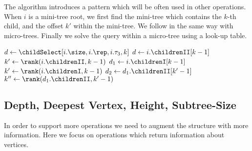 The algorithm \childSelect{} introduces a pattern which will be often used in other operations.
When $i$ is a mini-tree root, we first find the mini-tree which contains the $k$-th child, and the offset $k'$ within the mini-tree.
We follow in the same way with micro-trees.
Finally we solve the query within a micro-tree using a look-up table.

\begin{algorithm}
\begin{algorithmic}
		\State $d \gets \childSelect[i.\size, i.\rep, i.\tau_3, k]$
		\State {}
		\State $d \gets i.\childrenII[k - 1]$
		\State $k' \gets \rank(i.\childrenII, k - 1)$
		 
			\State {}
		\Else {}
			\State {}
		\EndIf
	\Else
		\State $d_1 \gets i.\childrenI[k - 1]$
		\State $k' \gets \rank(i.\childrenI, k - 1)$
		 
			\State $d_2 \gets d_1.\childrenII[k' - 1]$
			\State $k'' \gets \rank(d_1.\childrenII, k' - 1)$
			 
				\State {}
			\Else {}
				\State {}
			\EndIf
		\Else {}
			\State {}
		\EndIf
	\EndIf
\EndFunction
\end{algorithmic}
\end{algorithm}

\subsection{Depth, Deepest Vertex, Height, Subtree-Size}

In order to support more operations we need to augment the structure with more information.
Here we focus on operations which return information about vertices.

